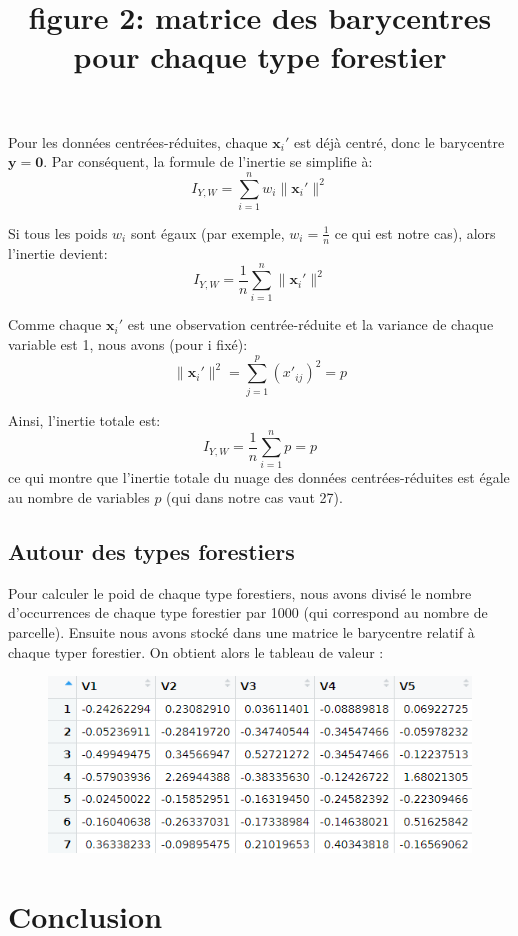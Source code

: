 \documentclass{article}
\begin{document}
Pour les données centrées-réduites, chaque $\mathbf{x}_i'$ est déjà centré, donc le barycentre $\mathbf{y} = \mathbf{0}$. Par conséquent, la formule de l'inertie se simplifie à:
\[
I_{Y, W} = \sum_{i=1}^n w_i \|\mathbf{x}_i'\|^2
\]

Si tous les poids $w_i$ sont égaux (par exemple, $w_i = \frac{1}{n}$ ce qui est notre cas), alors l'inertie devient:
\[
I_{Y, W} = \frac{1}{n} \sum_{i=1}^n \|\mathbf{x}_i'\|^2
\]

Comme chaque $\mathbf{x}_i'$ est une observation centrée-réduite et la variance de chaque variable est 1, nous avons (pour i fixé):
\[
\|\mathbf{x}_i'\|^2 = \sum_{j=1}^p (x'_{ij})^2 = p
\]

Ainsi, l'inertie totale est:
\[
I_{Y, W} = \frac{1}{n} \sum_{i=1}^n p = p 
\]
ce qui montre que l'inertie totale du nuage des données centrées-réduites est égale au nombre de variables $p$ (qui dans notre cas vaut 27).

\subsection{Autour des types forestiers}

Pour calculer le poid de chaque type forestiers, nous avons divisé le nombre d'occurrences de chaque type forestier par 1000 (qui correspond au nombre de parcelle). Ensuite nous avons stocké
dans une matrice le barycentre relatif à chaque typer forestier. On obtient alors le tableau de valeur :

\begin{figure}[h] 
    \centering
    \includegraphics[width=1\textwidth]{barycentre_forestier.png}
    \title{figure 2: matrice des barycentres pour chaque type forestier} 
\end{figure}


\newpage
\section{Conclusion}
\end{document}
